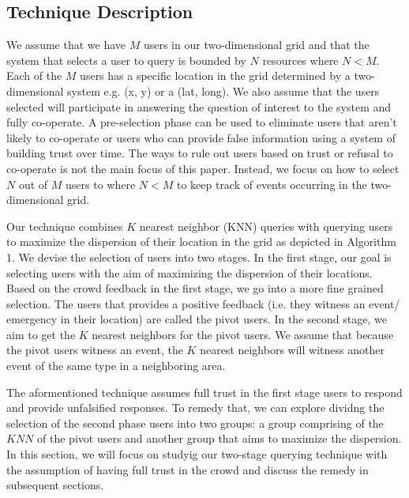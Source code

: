 \documentclass{acm_proc_article-sp}
\begin{document}
\subsection{Technique Description}
We assume that we have $M$ users in our two-dimensional grid and that the system that selects a user to query is bounded by $N$ resources where $N < M$.  Each of the $M$ users has a specific location in the grid determined by a two-dimensional system e.g. (x, y) or a (lat, long). We also assume that the users selected will participate in answering the question of interest to the system and fully co-operate. A pre-selection phase can be used to eliminate users that aren't likely to co-operate or users who can provide false information using a system of building trust over time. The ways to rule out users based on trust or refusal to co-operate is not the main focus of this paper. Instead, we focus on how to select $N$ out of $M$ users to  where $N < M$ to keep track of events occurring in the two-dimensional grid.\par
Our technique combines $K$ nearest neighbor (KNN) queries with querying users to maximize the dispersion of their location in the grid as depicted in Algorithm 1. We devise the selection of users into two stages. In the first stage, our goal is selecting users with the aim of maximizing the dispersion of their locations. Based on the crowd feedback in the first stage, we go into a more fine grained selection. The users that provides a positive feedback (i.e. they witness an event/ emergency in their location) are called the pivot users. In the second stage, we aim to get the $K$ nearest neighbors for the pivot users. We assume that because the pivot users witness an event, the $K$ nearest neighbors will witness another event of the same type in a neighboring area. \par
The aformentioned technique assumes full trust in the first stage users to respond and provide unfalsified responses. To remedy that, we can explore dividng the selection of the second phase users into two groups: a group comprising of the $KNN$ of the pivot users and another group that aims to maximize the dispersion. In this section, we will focus on studyig our two-stage querying technique with the assumption of having full trust in the crowd and discuss the remedy in subsequent sections.\par  
\end{document}
